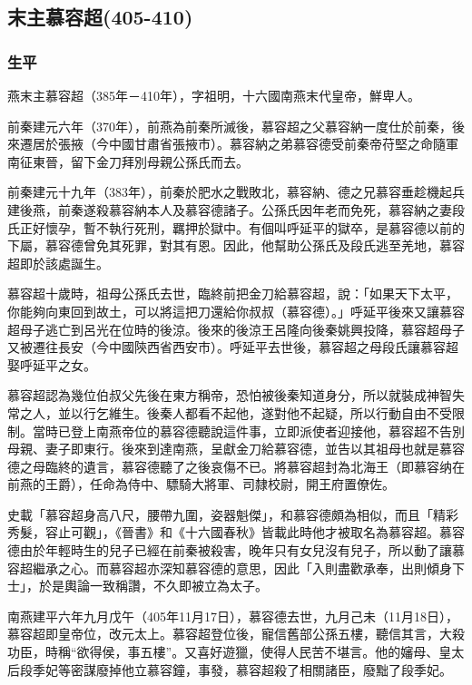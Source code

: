 
\subsection{末主慕容超\tiny(405-410)}

\subsubsection{生平}

燕末主慕容超（385年－410年），字祖明，十六國南燕末代皇帝，鮮卑人。

前秦建元六年（370年），前燕為前秦所滅後，慕容超之父慕容納一度仕於前秦，後來遷居於張掖（今中國甘肅省張掖市）。慕容納之弟慕容德受前秦帝苻堅之命隨軍南征東晉，留下金刀拜別母親公孫氏而去。

前秦建元十九年（383年），前秦於肥水之戰敗北，慕容納、德之兄慕容垂趁機起兵建後燕，前秦遂殺慕容納本人及慕容德諸子。公孫氏因年老而免死，慕容納之妻段氏正好懷孕，暫不執行死刑，羈押於獄中。有個叫呼延平的獄卒，是慕容德以前的下屬，慕容德曾免其死罪，對其有恩。因此，他幫助公孫氏及段氏逃至羌地，慕容超即於該處誕生。

慕容超十歲時，祖母公孫氏去世，臨終前把金刀給慕容超，說：「如果天下太平，你能夠向東回到故土，可以將這把刀還給你叔叔（慕容德）。」呼延平後來又讓慕容超母子逃亡到呂光在位時的後涼。後來的後涼王呂隆向後秦姚興投降，慕容超母子又被遷往長安（今中國陝西省西安市）。呼延平去世後，慕容超之母段氏讓慕容超娶呼延平之女。

慕容超認為幾位伯叔父先後在東方稱帝，恐怕被後秦知道身分，所以就裝成神智失常之人，並以行乞維生。後秦人都看不起他，遂對他不起疑，所以行動自由不受限制。當時已登上南燕帝位的慕容德聽說這件事，立即派使者迎接他，慕容超不告別母親、妻子即東行。後來到達南燕，呈獻金刀給慕容德，並告以其祖母也就是慕容德之母臨終的遺言，慕容德聽了之後哀傷不已。將慕容超封為北海王（即慕容纳在前燕的王爵），任命為侍中、驃騎大將軍、司隸校尉，開王府置僚佐。

史載「慕容超身高八尺，腰帶九圍，姿器魁傑」，和慕容德頗為相似，而且「精彩秀髮，容止可觀」，《晉書》和《十六國春秋》皆載此時他才被取名為慕容超。慕容德由於年輕時生的兒子已經在前秦被殺害，晚年只有女兒沒有兒子，所以動了讓慕容超繼承之心。而慕容超亦深知慕容德的意思，因此「入則盡歡承奉，出則傾身下士」，於是輿論一致稱讚，不久即被立為太子。

南燕建平六年九月戊午（405年11月17日），慕容德去世，九月己未（11月18日），慕容超即皇帝位，改元太上。慕容超登位後，寵信舊部公孫五樓，聽信其言，大殺功臣，時稱“欲得侯，事五樓”。又喜好遊獵，使得人民苦不堪言。他的嬸母、皇太后段季妃等密謀廢掉他立慕容鐘，事發，慕容超殺了相關諸臣，廢黜了段季妃。

